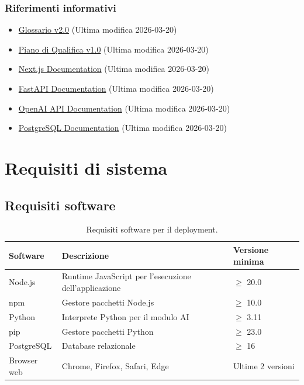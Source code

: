 \documentclass[a4paper, 11pt, oneside]{scrartcl}
\begin{document}
\subsubsection{Riferimenti informativi}
\begin{itemize}
    \item \href{https://swenightpro.github.io/Documentazione/docs/RTB/Documentazione%20Esterna/Glossario_v2.0.pdf}{Glossario v2.0} (Ultima modifica 2026-03-20)
    \item \href{https://swenightpro.github.io/Documentazione/docs/RTB/Documentazione%20Esterna/Piano_di_Qualifica_v1.0.pdf}{Piano di Qualifica v1.0} (Ultima modifica 2026-03-20)
    \item \href{https://nextjs.org/docs}{Next.js Documentation} (Ultima modifica 2026-03-20)
    \item \href{https://fastapi.tiangolo.com/}{FastAPI Documentation} (Ultima modifica 2026-03-20)
    \item \href{https://platform.openai.com/docs}{OpenAI API Documentation} (Ultima modifica 2026-03-20)
    \item \href{https://www.postgresql.org/docs/}{PostgreSQL Documentation} (Ultima modifica 2026-03-20)
\end{itemize}

\newpage
\section{Requisiti di sistema}

\subsection{Requisiti software}
\begin{table}[H]
    \centering
    \renewcommand{\arraystretch}{1.2}
    \begin{tabularx}{\textwidth}{@{}lXl@{}}
        \toprule
        \textbf{Software} & \textbf{Descrizione} & \textbf{Versione minima} \\
        \midrule
        Node.js & Runtime JavaScript per l'esecuzione dell'applicazione & $\geq$ 20.0 \\
        npm & Gestore pacchetti Node.js & $\geq$ 10.0 \\
        Python & Interprete Python per il modulo AI & $\geq$ 3.11 \\
        pip & Gestore pacchetti Python & $\geq$ 23.0 \\
        PostgreSQL & Database relazionale & $\geq$ 16 \\
        Browser web & Chrome, Firefox, Safari, Edge & Ultime 2 versioni \\
        \bottomrule
    \end{tabularx}
    \caption{Requisiti software per il deployment.}
\end{table}
\end{document}
